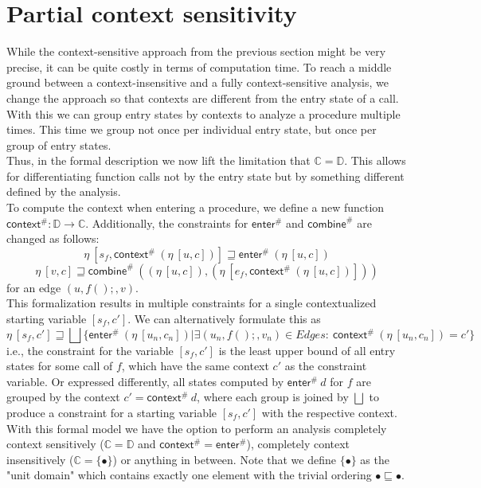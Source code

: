   \section{Partial context sensitivity}\label{sec:partialCtxSens}
    While the context-sensitive approach from the previous section might be very precise, it can be quite costly in terms of computation time. To reach a middle ground between a context-insensitive and a fully context-sensitive analysis, we change the approach so that contexts are different from the entry state of a call. With this we can group entry states by contexts to analyze a procedure multiple times. This time we group not once per individual entry state, but once per group of entry states.\\
    Thus, in the formal description we now lift the limitation that $\mathbb{C} = \mathbb{D}$. This allows for differentiating function calls not by the entry state but by something different defined by the analysis.\\
    To compute the context when entering a procedure, we define a new function $\textsf{context}^{\#}: \mathbb{D} \rightarrow \mathbb{C}$. Additionally, the constraints for $\textsf{enter}^{\#}$ and $\textsf{combine}^{\#}$ are changed as follows:
    \[\eta\ [s_f, \textsf{context}^{\#}\ (\eta\ [u, c])] \sqsupseteq \textsf{enter}^{\#}\ (\eta\ [u, c]) \]
    \[\eta\ [v, c] \sqsupseteq \textsf{combine}^{\#}\ ((\eta\ [u, c]), (\eta\ [e_f, \textsf{context}^{\#}\ (\eta\ [u, c])])) \]
    for an edge $(u, f();, v)$.\\
    This formalization results in multiple constraints for a single contextualized starting variable $[s_f, c']$. We can alternatively formulate this as
    \[\eta\ [s_f, c'] \sqsupseteq \bigsqcup \{\textsf{enter}^{\#}\ (\eta\ [u_n, c_n]) | \exists (u_n, f();, v_n) \in Edges:\ \textsf{context}^{\#}\ (\eta\ [u_n, c_n]) = c' \} \]
    i.e., the constraint for the variable $[s_f, c']$ is the least upper bound of all entry states for some call of $f$, which have the same context $c'$ as the constraint variable. Or expressed differently, all states computed by $\textsf{enter}^{\#}\ d$ for $f$ are grouped by the context $c' = \textsf{context}^{\#}\ d$, where each group is joined by $\bigsqcup$ to produce a constraint for a starting variable $[s_f, c']$ with the respective context.\\ 
    With this formal model we have the option to perform an analysis completely context sensitively ($\mathbb{C} = \mathbb{D}$ and $\textsf{context}^{\#} = \textsf{enter}^{\#}$), completely context insensitively ($\mathbb{C} = \{\bullet\}$) or anything in between. Note that we define $\{\bullet\}$ as the "unit domain" which contains exactly one element with the trivial ordering $\bullet \sqsubseteq \bullet$.\\
